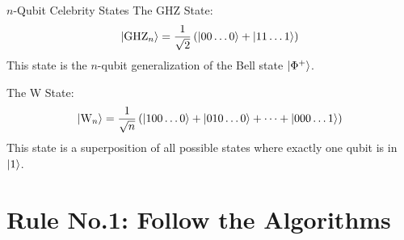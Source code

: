 \documentclass[11pt, letterpaper]{article}
\begin{document}
\begin{SBUBox}{$n$-Qubit Celebrity States}
  The GHZ State:
  \begin{equation*}
    \ket{\text{GHZ}_n} = \frac{1}{\sqrt{2}} \left( \ket{00\dots0} + \ket{11\dots1} \right)
  \end{equation*}
  This state is the $n$-qubit generalization of the Bell state $\ket{\Phi^+}$. 
  
  The W State:
  \begin{equation*}
    \ket{\text{W}_n} = \frac{1}{\sqrt{n}} \left( \ket{100\dots0} + \ket{010\dots0} + \dots + \ket{000\dots1} \right)
  \end{equation*}
  This state is a superposition of all possible states where exactly one qubit is in $\ket{1}$.
\end{SBUBox}


\newpage
\section{Rule No.1: Follow the Algorithms}
\end{document}
